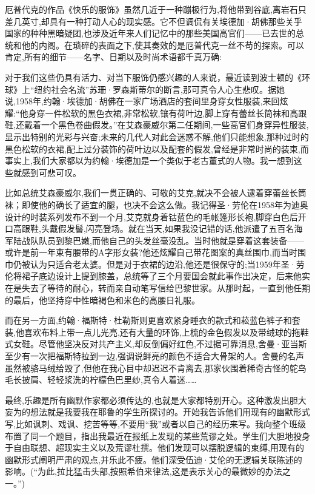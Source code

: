 厄普代克的作品《快乐的服饰》虽然几近于一种蹦极行为,将他带到谷底,离岩石只差几英寸,却具有一种打动人心的现实感。它不但调侃有关埃德加·胡佛那些关乎国家的种种黑暗疑团,也涉及近年来人们记忆中的那些美国高官们——已去世的总统和他的内阁。在琐碎的表面之下,使其奏效的是厄普代克一丝不苟的探索。可以肯定,所有的细节——名字、日期以及时尚术语都千真万确:

对于我们这些仍具有活力、对当下服饰仍感兴趣的人来说，最近读到波士顿的《环球》上“纽约社会名流”苏珊·罗森斯蒂尔的断言,那可真令人心生悲叹。据她说,1958年,约翰·埃德加·胡佛在一家广场酒店的套间里身穿女性服装,来回炫耀:“他身穿一件松软的黑色衣裙,非常松软,镶有荷叶边,脚上穿有蕾丝长筒袜和高跟鞋,还戴着一个黑色卷曲假发。”在艾森豪威尔第二任期间,一些高官们身穿异性服装,显示出特别的光彩与兴奋;未来的几代人对此会迷惑不解,他们只能想象,那种过时的黑色松软的衣裙,配上过分装饰的荷叶边以及配套的假发,曾经是非常时尚的装束,而事实上,我们大家都以为约翰·埃德加是一个类似于老古董式的人物。我一想到这些就感到可悲可叹。

比如总统艾森豪威尔,我们一贯正确的、可敬的艾克,就决不会被人逮着穿蕾丝长筒袜；即使他的确长了适宜的腿，也决不会这么做。我记得圣·劳伦在1958年为迪奥设计的时装系列发布不到一个月,艾克就身着钴蓝色的毛帐篷形长袍,脚穿白色后开口高跟鞋,头戴假发髻,闪亮登场。就在当天,如果我没记错的话,他派遣了五百名海军陆战队队员到黎巴嫩,而他自己的头发丝毫没乱。当时他就是穿着这套装备——或许是前一年束有腰带的A字形女装?他还炫耀自己带花图案的真丝围巾,而当时围巾仍被认为只适合老太婆。但是对于衣裙的边沿,他还是很保守的;当1959年圣·劳伦将裙子底边设计上提到膝盖，总统等了三个月要国会就此事作出决定，后来他实在是失去了等待的耐心，转而亲自动笔写信给巴黎世家。从那时起，一直到他任期的最后，他坚持穿中性暗褐色和米色的高腰日礼服。

而在另一方面,约翰·福斯特·杜勒斯则更喜欢紧身睡衣的款式和菘蓝色裤子和套装,他喜欢布料上带一点儿光亮,还有大量的环饰,上梳的金色假发以及带绒球的拖鞋式女鞋。尽管他坚决反对共产主义,却反倒偏好红色,不过据可靠消息,舍曼·亚当斯至少有一次把福斯特拉到一边,强调说鲜亮的颜色不适合大骨架的人。舍曼的名声虽然被骆马绒给毁了,但他在我心目中却迟迟不肯离去,那家伙围着稀奇古怪的鸵鸟毛长披肩、轻轻浆洗的柠檬色巴里纱,真令人着迷……

最终,乐趣是所有幽默作家都必须传达的,也就是大家都特别开心。这种激发出胆大妄为的想法就是我要我在耶鲁的学生所探讨的。开始我告诉他们用现有的幽默形式写,比如讽刺、戏讽、挖苦等等,不要用“我”或者以自己的经历来写。我向整个班级布置了同一个题目，指出我最近在报纸上发现的某些荒谬之处。学生们大胆地投身于自由联想、超现实主义以及荒谬杜撰。他们发现可以摆脱逻辑的束缚,用现有的幽默形式阐明严肃的观点,并乐此不疲。他们深受伍迪·艾伦的无逻辑关联陈述的影响。(“为此,拉比猛击头部,按照希伯来律法,这是表示关心的最微妙的办法之一。”)

